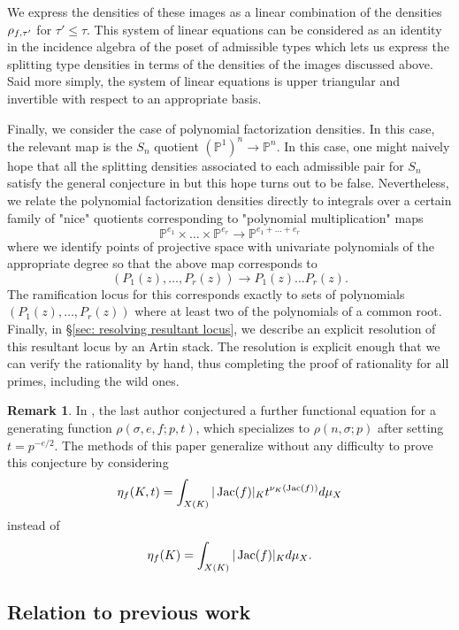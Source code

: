 \documentclass[10pt]{article}
\theoremstyle{plain}
\theoremstyle{definition}
\newtheorem{remark}[theorem]{Remark}
\numberwithin{equation}{section}
\begin{document}
We express the densities of these images as a linear combination of the densities $\rho_{f,\tau'}$ for $\tau' \leq \tau$. This system of linear equations can be considered as an identity in the incidence algebra of the poset of admissible types which lets us express the splitting type densities in terms of the densities of the images discussed above. Said more simply, the system of linear equations is upper triangular and invertible with respect to an appropriate basis.

Finally, we consider the case of polynomial factorization densities. In this case, the relevant map is the $S_n$ quotient $(\mathbb P^1)^n \to \mathbb P^n$. In this case, one might naively hope that all the splitting densities associated to each admissible pair for $S_n$ satisfy the general conjecture in \cite{bhargava2022density} but this hope turns out to be false. Nevertheless, we relate the polynomial factorization densities directly to integrals over a certain family of "nice" quotients corresponding to "polynomial multiplication" maps
\[\mathbb P^{e_1}\times\dots\times \mathbb P^{e_r} \to \mathbb P^{e_1+\dots+e_r}\]
where we identify points of projective space with univariate polynomials of the appropriate degree so that the above map corresponds to
\[(P_1(z),\dots,P_r(z)) \to P_1(z)\dots P_r(z).\]
The ramification locus for this corresponds exactly to sets of polynomials $(P_1(z),\dots,P_r(z))$ where at least two of the polynomials of a common root. Finally, in \S\ref{sec: resolving resultant locus}, we describe an explicit resolution of this resultant locus by an Artin stack. The resolution is explicit enough that we can verify the rationality by hand, thus completing the proof of rationality for all primes, including the wild ones.


\begin{remark}
In \cite[Conjecture 9.1]{john}, the last author conjectured a further functional equation for a generating function $\rho(\sigma,e,f;p,t)$, which specializes to $\rho(n,\sigma;p)$ after setting $t=p^{-e/2}$. The methods of this paper generalize without any difficulty to prove this conjecture by considering \[\eta_f(K,t) = \int_{X(K)}|\operatorname{Jac}(f)|_{K}t^{\nu_K (\operatorname{Jac}(f))}d\mu_{X}\] instead of \[\eta_f(K) = \int_{X(K)}|\operatorname{Jac}(f)|_{K}d\mu_{X}.\]
\end{remark}

\subsection{Relation to previous work}
\end{document}
